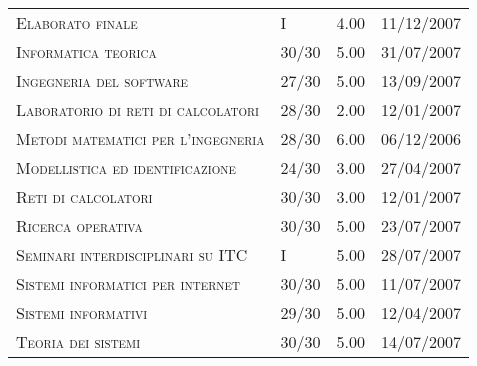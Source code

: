 \begin{tabular}{p{8cm}lll}
\textsc{Elaborato finale}                                       &  I                 &  4.00           &     11/12/2007       \\
\textsc{Informatica teorica}                                    &  30/30             &  5.00           &     31/07/2007       \\
\textsc{Ingegneria del software}                                &  27/30             &  5.00           &     13/09/2007       \\
\textsc{Laboratorio di reti di calcolatori}                     &  28/30             &  2.00           &     12/01/2007       \\
\textsc{Metodi matematici per l'ingegneria}                     &  28/30             &  6.00           &     06/12/2006       \\
\textsc{Modellistica ed identificazione}                        &  24/30             &  3.00           &     27/04/2007       \\
\textsc{Reti di calcolatori}                                    &  30/30             &  3.00           &     12/01/2007       \\
\textsc{Ricerca operativa}                                      &  30/30             &  5.00           &     23/07/2007       \\
\textsc{Seminari interdisciplinari su ITC}                      &  I                 &  5.00           &     28/07/2007       \\
\textsc{Sistemi informatici per internet}                       &  30/30             &  5.00           &     11/07/2007       \\
\textsc{Sistemi informativi}                                    &  29/30             &  5.00           &     12/04/2007       \\
\textsc{Teoria dei sistemi}                                     &  30/30             &  5.00           &     14/07/2007       \\

\end{tabular}
